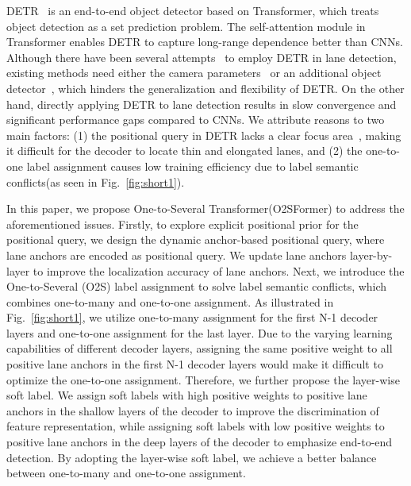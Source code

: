 \documentclass{bmvc2k}
\begin{document}
   DETR~\cite{carion2020end} is an end-to-end object detector based on Transformer, which treats object detection as a set prediction problem. 
   The self-attention module in Transformer enables DETR to capture long-range dependence better than CNNs. 
   Although there have been several attempts~\cite{han2022laneformer,liu2021end} to employ DETR in lane detection, existing methods need either 
   the camera parameters~\cite{liu2021end} or an additional object detector~\cite{han2022laneformer}, which hinders the generalization and flexibility 
   of DETR. On the other hand, directly applying DETR to lane detection results in slow convergence and significant 
   performance gaps compared to CNNs. We attribute reasons to two main factors: (1) the positional query in 
   DETR lacks a clear focus area~\cite{meng2021conditional}, making it difficult for the decoder to locate thin and elongated lanes, 
   and (2) the one-to-one label assignment causes low training efficiency due to label semantic conflicts(as seen in Fig.~\ref{fig:short1}).
   
   In this paper, we propose One-to-Several Transformer(O2SFormer) to address the aforementioned issues. 
   Firstly, to explore explicit positional prior for the positional query, we design the dynamic anchor-based 
   positional query, where lane anchors are encoded as positional query. We update lane anchors layer-by-layer 
   to improve the localization accuracy of lane anchors. Next, we introduce the One-to-Several (O2S) 
   label assignment to solve label semantic conflicts, which combines one-to-many and one-to-one assignment. 
   As illustrated in Fig.~\ref{fig:short1}, we utilize one-to-many assignment for the first N-1 decoder layers and one-to-one assignment 
   for the last layer. Due to the varying learning capabilities of different decoder layers, assigning the same 
   positive weight to all positive lane anchors in the first N-1 decoder layers would make it difficult to optimize 
   the one-to-one assignment. Therefore, we further propose the layer-wise soft label. We assign soft labels with high positive 
   weights to positive lane anchors in the shallow layers of the decoder to improve the discrimination of feature representation, 
   while assigning soft labels with low positive weights to positive lane anchors in the deep layers of the decoder to emphasize end-to-end detection. 
   By adopting the layer-wise soft label, we achieve a better balance between one-to-many and one-to-one assignment. 
   
\end{document}
